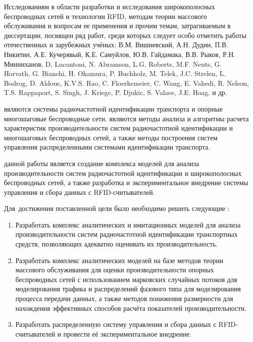 Исследованиям в области разработки и исследования широкополосных беспроводных сетей и технологии RFID, методам теории массового обслуживания и вопросам ее применения и прочим темам, затрагиваемым в диссертации, посвящен ряд работ, среди которых следует особо отметить работы отечественных и зарубежных учёных: В.М. Вишневский, А.Н. Дудин, П.В. Никитин, А.Е. Кучерявый, К.Е. Самуйлов, Ю.В. Гайдамака, В.В. Рыков, Р.Н. Минниханов, D. Lucantoni, N. Abramson, L.G. Roberts, M.F. Neuts, G. Horvath, G. Bianchi,  H. Okamura, P. Buchholz, M. Telek, J.C. Strelen, L. Bodrog, D. Aldous, K.V.S. Rao, C. Floerkemeier, C. Wang, E. Vahedi, R. Nelson, T.S. Rappaport, S. Singh, J. Kriege, P. Djukic, S. Valaee, J.E. Hoag. и др.


{\object} являются системы радиочастотной идентификации транспорта и опорные многошаговые беспроводные сети. {\objective} являются методы анализа и алгоритмы расчета характеристик производительности систем радиочастотной идентификации и многошаговых беспроводных сетей, а также методы построения систем управления распределенными системами идентификации транспорта.

{\aim} данной работы является создание комплекса моделей для анализа производительности систем радиочастотной идентификации и широкополосных беспроводных сетей, а также разработка и экспериментальное внедрение системы управления и сбора данных с RFID-считывателей.

Для~достижения поставленной цели было необходимо решить следующие {\tasks}:
\begin{enumerate}[beginpenalty=10000] %
  \item Разработать комплекс аналитических и имитационных моделей для анализа производительности систем радиочастотной идентификации транспортных средств, позволяющих адекватно оценивать их производительность.
  \item Разработать комплекс аналитических моделей на базе методов теории массового обслуживания для оценки производительности опорных беспроводных сетей с использованием марковских случайных потоков для моделирования трафика и распределений фазового типа для моделирования процесса передачи данных, а также методов понижения размерности для нахождения эффективных способов расчёта показателей производительности.
  \item Разработать распределенную систему управления и сбора данных с RFID-считывателей и провести её экспериментальное внедрение.
\end{enumerate}


